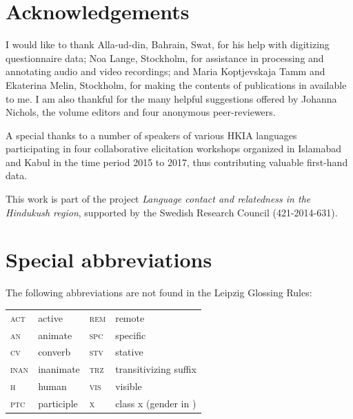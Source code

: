 \documentclass[output=collectionpaper]{langsci/langscibook}
\begin{document}
\section*{Acknowledgements}

I would like to thank Alla-ud-din, Bahrain, Swat, for his help with digitizing questionnaire data; Noa Lange, Stockholm, for assistance in processing and annotating audio and video recordings; and Maria Koptjevskaja Tamm and Ekaterina Melin, Stockholm, for making the contents of publications in  available to me. I am also thankful for the many helpful suggestions offered by Johanna Nichols, the volume editors and four anonymous peer-reviewers.

A special thanks to a number of speakers of various HKIA languages participating in four collaborative elicitation workshops organized in Islamabad and Kabul in the time period 2015 to 2017, thus contributing valuable first-hand data.

This work is part of the project \textit{Language contact and relatedness in the Hindukush region}, supported by the Swedish Research Council (421-2014-631).

\section*{Special abbreviations}

\noindent The following abbreviations are not found in the Leipzig Glossing Rules:

\begin{tabular}{llll}
\textsc{act} 	&	 active	&	\textsc{rem} 	&	 remote	\\
\textsc{an} 	&	 animate &	\textsc{spc} 	&	 specific\\
\textsc{cv} 	&	 converb &	\textsc{stv} 	&	 stative\\
\textsc{inan} 	&	 inanimate	&	\textsc{trz} 	&	 transitivizing suffix \\
\textsc{h}& human &	\textsc{vis} 	&	 visible	\\
\textsc{ptc} &	 participle & \textsc{x} 	&	 class x (gender in	\ili{Burushaski})	\\
\end{tabular}



\begingroup
\setlength{\emergencystretch}{8em}
\printbibliography[heading=subbibliography,notkeyword=this]
\endgroup
\end{document}
